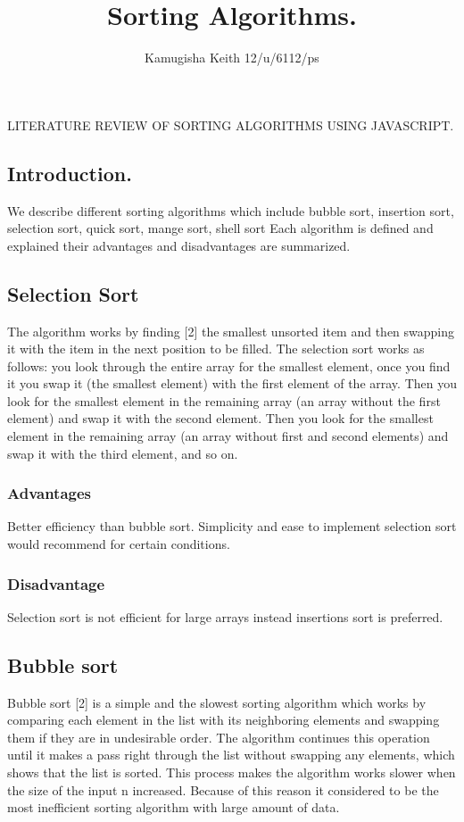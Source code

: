 \documentclass{article}
\title{Sorting Algorithms.}
\author{Kamugisha Keith 12/u/6112/ps}
\begin{document}
LITERATURE REVIEW OF SORTING ALGORITHMS USING JAVASCRIPT. 
\subsection{Introduction.}
	We describe different sorting algorithms which include bubble sort, insertion sort, selection sort, quick sort, mange sort, shell sort  Each algorithm is defined and explained their advantages and disadvantages are summarized.
	
\subsection{Selection Sort}
	The algorithm works by finding [2] the smallest unsorted item and then swapping it with the item in the next position to be filled. The selection sort works as follows: you look through the entire array for the smallest element, once you find it you swap it (the smallest element) with the first element of the array. Then you look for the smallest element in the remaining array (an array without the first element) and swap it with the second element. Then you look for the smallest element in the remaining array (an array without first and second elements) and swap it with the third element, and so on.
\subsubsection{Advantages}
	Better efficiency than bubble sort. 
	Simplicity and ease to implement selection sort would recommend for certain conditions.
	
\subsubsection{Disadvantage}
	Selection sort is not efficient for large arrays instead insertions sort is preferred.



\subsection{Bubble sort}
	Bubble sort [2] is a simple and the slowest sorting algorithm which works by comparing each element in the list with its neighboring elements and swapping them if they are in undesirable order. The algorithm continues this operation until it makes a pass right through the list without swapping any elements, which shows that the list is sorted. This process makes the algorithm works slower when the size of the input n increased. Because of this reason it considered to be the most inefficient sorting algorithm with large amount of data.
\end{document}
